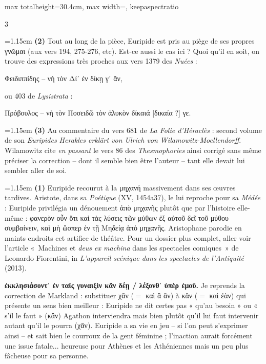 \documentclass[11pt,twoside]{book}
\newcommand{\italique}[1]{\textit{#1}}
\newcommand{\citComm}[1]{\begin{quoting}[vskip=0.4pt,leftmargin=0.7em,rightmargin=0.2em]#1\end{quoting}}
\begin{document}
\begin{adjustbox}{max totalheight=30.4cm, max width=\textwidth, keepaspectratio}
\begin{minipage}{\textwidth}
{\begin{multicols}{3}
\par\vspace{1.5pt}
\noindent\hangindent=1.15em {\color{sepiaNote}\textbf{(2)}} Tout au long de la pièce, Euripide est pris au piège de ses propres γνῶμαι (aux vers 194, 275-276, etc). Est-ce aussi le cas ici ? Quoi qu'il en soit, on trouve des expressions très proches aux vers 1379 des \italique{Nuées} :
\citComm{Φειδιππίδης -- νὴ τὸν Δί᾽ ἐν δίκῃ γ᾽ ἄν,}
\par\vspace{1.5pt}
\noindent ou 403 de \italique{Lysistrata} :
\citComm{Πρόβουλος -- νὴ τὸν Ποσειδῶ τὸν ἁλυκὸν δίκαιά [δικαία ?] γε.}
\par\vspace{1.5pt}
\noindent\hangindent=1.15em {\color{sepiaNote}\textbf{(3)}} Au commentaire du vers 681 de \italique{La Folie d'Héraclès} : second volume de son \italique{Euripides Herakles erklärt von Ulrich von Wilamowitz-Moellendorff}. Wilamowitz cite \italique{en passant} le vers 86 des \italique{Thesmophories} ainsi corrigé sans même préciser la correction -- dont il semble bien être l'auteur -- tant elle devait lui sembler aller de soi.
\par\vspace{1.5pt}
\noindent\hangindent=1.15em {\color{sepiaNote}\textbf{(1)}} Euripide recourut à la μηχανή massivement dans ses œuvres tardives. Aristote, dans sa \italique{Poétique} (XV, 1454a37), le lui reproche pour sa \italique{Médée} : Euripide privilégia un dénouement ἀπὸ μηχανῆς plutôt que par l'histoire elle-même : φανερὸν οὖν ὅτι καὶ τὰς λύσεις τῶν μύθων ἐξ αὐτοῦ δεῖ τοῦ μύθου συμβαίνειν, καὶ μὴ ὥσπερ ἐν τῇ Μηδείᾳ ἀπὸ μηχανῆς. Aristophane parodie en maints endroits cet artifice de théâtre. Pour un dossier plus complet, aller voir l'article «~Machines et \italique{deus ex machina} dans les spectacles comiques~» de Leonardo Fiorentini, in \italique{L'appareil scénique dans les spectacles de l'Antiquité} (2013).
\par\vspace{1.5pt}
 \textbf{ἐκκλησιάσοντ᾽ ἐν ταῖς γυναιξὶν κἂν δέῃ / λέξονθ᾽ ὑπὲρ ἐμοῦ.} Je reprends la correction de Markland : substituer χἂν ($=$ καὶ ἃ ἂν) à κἂν ($=$ καὶ ἐὰν) qui présente un sens bien meilleur : Euripide ne dit certes pas « qu'au besoin » ou « s'il le faut » (κἂν) Agathon interviendra mais bien plutôt qu'il lui faut intervenir autant qu'il le pourra (χἂν). Euripide a sa vie en jeu – si l'on peut s'exprimer ainsi – et sait bien le courroux de la gent féminine ; l'inaction aurait forcément une issue fatale... heureuse pour Athènes et les Athéniennes mais un peu plus fâcheuse pour sa personne.

\end{multicols}}
\end{minipage}
\end{adjustbox}
\end{document}
